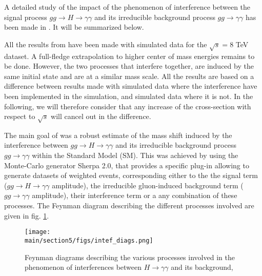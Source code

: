 A detailed study of the impact of the phenomenon of interference between the signal process $gg \rightarrow H \rightarrow \gamma\gamma$ and its irreducible background process $gg \rightarrow \gamma\gamma$ has been made in \cite{ATL-PHYS-PUB-2016-009}. It will be summarized below.

All the results from \cite{ATL-PHYS-PUB-2016-009} have been made with simulated data for the $\sqrt{s} = 8$ TeV dataset. A full-fledge extrapolation to higher center of mass energies remains to be done. However, the two processes that interfere together, are induced by the same initial state and are at a similar mass scale. All the results are based on a difference between results made with simulated data where the interference have been implemented in the simulation, and simulated data where it is not. In the following, we will therefore consider that any increase of the cross-section with respect to $\sqrt{s}$ will cancel out in the difference.

The main goal of \cite{ATL-PHYS-PUB-2016-009} was a robust estimate of the mass shift induced by the interference between $gg \rightarrow H \rightarrow \gamma\gamma$ and its irreducible background process $gg \rightarrow \gamma\gamma$ within the Standard Model (SM). This was achieved by using the Monte-Carlo generator Sherpa 2.0, that provides a specific plug-in allowing to generate datasets of weighted events, corresponding either to the the signal term ($gg \rightarrow H \rightarrow \gamma\gamma$ amplitude), the irreducible gluon-induced background term ($gg \rightarrow \gamma\gamma$ amplitude), their interference term or a any combination of these processes. The Feynman diagram describing the different processes involved are given in fig. \ref{fig:intef_diags}. 

\begin{figure}
    \centering
    \texttt{[image: \\main/section5/figs/intef\_diags.png]}
    \caption{Feynman diagrams describing the various processes involved in the phenomenon of interferences between $H\rightarrow\gamma\gamma$ and its background,}
    \label{fig:intef_diags}
\end{figure}

